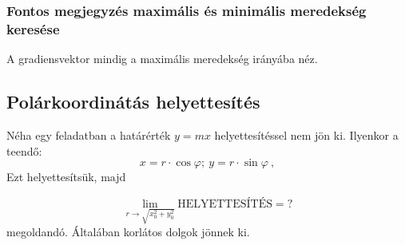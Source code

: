\subsubsection*{Fontos megjegyzés maximális és minimális meredekség keresése}
A gradiensvektor mindig a maximális meredekség irányába néz.

\subsection*{Polárkoordinátás helyettesítés}
Néha egy feladatban a határérték $y = mx$ helyettesítéssel nem jön ki. Ilyenkor a teendő:
\[
  x = r \cdot \cos \varphi;\ y = r \cdot \sin \varphi\ ,
\]
Ezt helyettesítsük, majd

\begin{equation}
\lim_{r \rightarrow \sqrt{x_0^2 + y_0^2}} \text{HELYETTESÍTÉS} = ?
\end{equation}
megoldandó. Általában korlátos dolgok jönnek ki.


